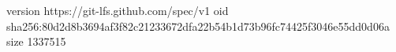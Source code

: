 version https://git-lfs.github.com/spec/v1
oid sha256:80d2d8b3694af3f82c21233672dfa22b54b1d73b96fc74425f3046e55dd0d06a
size 1337515
